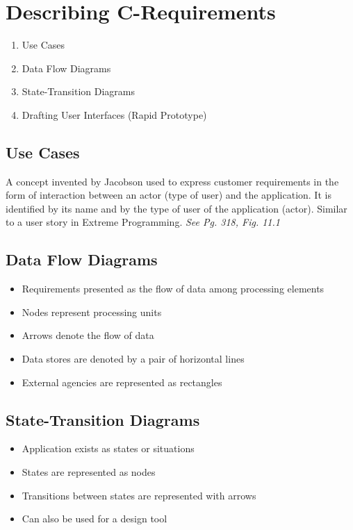 \documentclass{report}
\begin{document}
		\section{Describing C-Requirements}
			\begin{enumerate}
				\item Use Cases
				\item Data Flow Diagrams
				\item State-Transition Diagrams
				\item Drafting User Interfaces (Rapid Prototype)
			\end{enumerate}
			\subsection{Use Cases}
				A concept invented by Jacobson used to express customer requirements in the form of interaction between an actor (type of user) and the application. It is identified by its name and by the type of user of the application (actor). Similar to a user story in Extreme Programming. \textit{See Pg. 318, Fig. 11.1}
			\subsection{Data Flow Diagrams}
				\begin{itemize}
					\item Requirements presented as the flow of data among processing elements
					\item Nodes represent processing units
					\item Arrows denote the flow of data
					\item Data stores are denoted by a pair of horizontal lines
					\item External agencies are represented as rectangles
				\end{itemize}
			\subsection{State-Transition Diagrams}
				\begin{itemize}
					\item Application exists as states or situations
					\item States are represented as nodes
					\item Transitions between states are represented with arrows
					\item Can also be used for a design tool
				\end{itemize}
\end{document}
